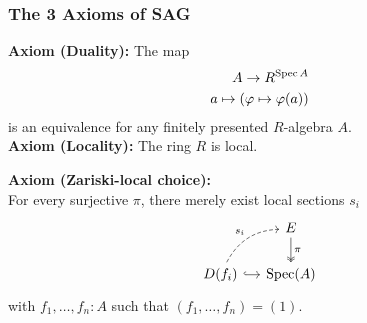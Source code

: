 \documentclass{beamer}
\begin{document}
\begin{frame}
  \frametitle{The 3 Axioms of SAG}
    \textbf{Axiom (Duality):}
    The map
    \begin{align*}
      A \to R^{\operatorname{Spec} A} \\
      a\mapsto (\varphi\mapsto \varphi(a))
    \end{align*}
    is an equivalence
    for any finitely presented $R$-algebra $A$. \\
  \pause
  \vspace{1.5mm}
  \textbf{Axiom (Locality):} The ring $R$ is local.

  \vspace{1.5mm}
  \textbf{Axiom (Zariski-local choice):}\\
  For every surjective $\pi$, there merely exist local sections $s_i$
  \[ \begin{tikzcd}[ampersand replacement=\&, column sep=small]
    \& E \ar[d, two heads, "\pi"] \\
    D(f_i) \ar[r, hook] \ar[ur, bend left, dashed, "s_i"] \& \Spec(A)
  \end{tikzcd} \]
  with $f_1, \dots, f_n : A$ such that $(f_1,\dots,f_n)=(1)$.
\end{frame}
\end{document}

